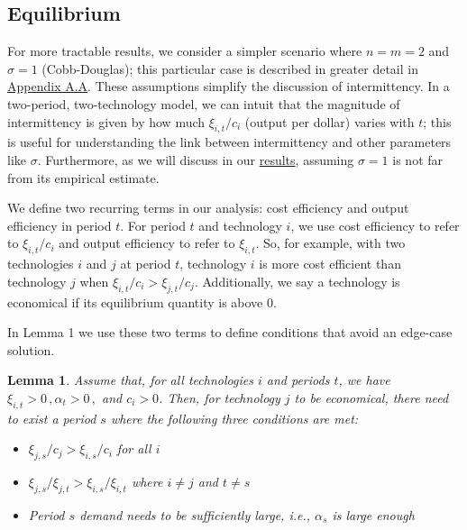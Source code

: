 \documentclass[11pt,a4paper,leqno]{extarticle}
\newtheorem{lemma}{Lemma}
\begin{document}
	\subsection{Equilibrium}
	
	For more tractable results, we consider a simpler scenario where $n = m = 2$ and $\sigma = 1$ (Cobb-Douglas); this particular case is described in greater detail in \hyperref[sec:cobbdoug]{Appendix A.A}. These assumptions simplify the discussion of intermittency. In a two-period, two-technology model, we can intuit that the magnitude of intermittency is given by how much $\xi_{i,t}/c_i$ (output per dollar) varies with $t$; this is useful for understanding the link between intermittency and other parameters like $\sigma$. Furthermore, as we will discuss in our \hyperref[sec:results]{results}, assuming $\sigma=1$ is not far from its empirical estimate.
	
	We define two recurring terms in our analysis: cost efficiency and output  efficiency in period $t$. For period $t$ and technology $i$, we use cost efficiency to refer to $\xi_{i,t}/c_i$ and output efficiency to refer to $\xi_{i,t}$. So, for example, with two technologies $i$ and $j$ at period $t$, technology $i$ is more cost efficient than technology $j$ when $\xi_{i,t}/c_i > \xi_{j,t}/c_j$. Additionally, we say a technology is economical if its equilibrium quantity is above 0.
	
	In Lemma 1 we use these two terms to define conditions that avoid an edge-case solution.
	\begin{lemma}
		Assume that, for all technologies $i$ and periods $t$, we have $\xi_{i,t} > 0 \, , \alpha_t > 0 \, ,$ and $ c_i > 0$. Then, for technology $j$ to be economical, there need to exist a period $s$ where the following three conditions are met:
		\begin{itemize}
			\item $\xi_{j,s}/c_j > \xi_{i,s}/c_i$ for all $i$
			\item $\xi_{j,s}/\xi_{j,t} >  \xi_{i,s}/\xi_{i,t} $ where $i \neq j$ and $t \neq s$
			\item Period $s$ demand needs to be sufficiently large, i.e., $\alpha_s$ is large enough
		\end{itemize}
	\end{lemma}
	
\end{document}
